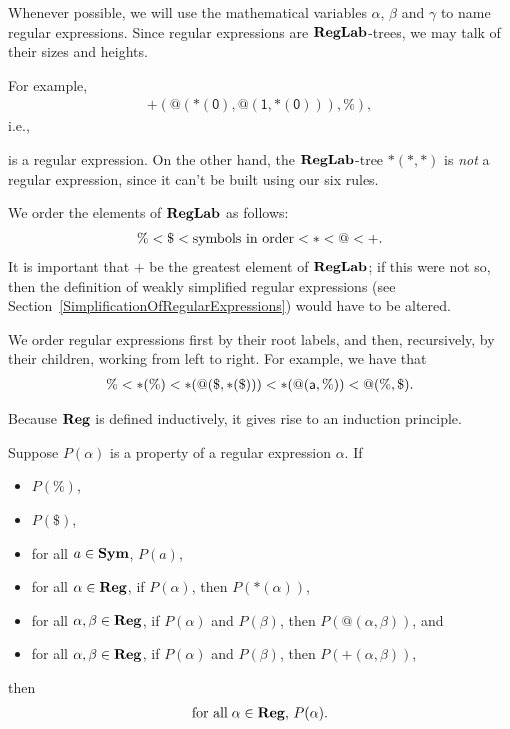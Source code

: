 Whenever possible, we will use the mathematical variables
$\alpha$, $\beta$ and $\gamma$
%
%
to name regular expressions. Since regular expressions are
$\mathbf{RegLab}$-trees, we may talk of their sizes and heights.

For example,
\begin{gather*}
\mathsf{{+}(@({*}(0),@(1,{*}(0))),\%)} ,
\end{gather*}
i.e.,
\begin{center}

\end{center}
is a regular expression.  On the other hand, the $\mathbf{RegLab}$-tree
$*(*,*)$ is \emph{not} a regular expression, since it can't be
built using our six rules.

We order the elements of $\mathbf{RegLab}$ as follows:
\begin{gather*}
\% < \$ < \allowbreak\mbox{symbols in order}\allowbreak < {*} < @ < {+} .
\end{gather*}
%
It is important that ${+}$ be the greatest element of $\mathbf{RegLab}$;
if this were not so, then the definition of weakly simplified regular
expressions (see Section~\ref{SimplificationOfRegularExpressions})
would have to be altered.

We order regular expressions first by their root labels, and then,
recursively, by their children, working from left to right.
For example, we have that
\begin{gather*}
\% < {*}(\%)
   < {*}(@(\$,{*}(\$)))
   < {*}(@(\mathsf{a},\%))
   < @(\%,\$) .
\end{gather*}

Because $\mathbf{Reg}$ is defined inductively, it gives rise to an induction
principle.

\begin{theorem}
Suppose $P(\alpha)$ is a property of a regular expression $\alpha$.
If
\begin{itemize}
\item $P(\%)$,

\item $P(\$)$,

\item for all $a\in\mathbf{Sym}$, $P(a)$,

\item for all $\alpha\in\mathbf{Reg}$, if $P(\alpha)$, then
$P({*}(\alpha))$,

\item for all $\alpha,\beta\in\mathbf{Reg}$, if $P(\alpha)$ and
$P(\beta)$, then $P(@(\alpha,\beta))$, and

\item for all $\alpha,\beta\in\mathbf{Reg}$, if $P(\alpha)$ and
$P(\beta)$, then $P({+}(\alpha,\beta))$,
\end{itemize}
then
\begin{gather*}
\allowbreak\mbox{for all}\allowbreak\;\alpha\in\mathbf{Reg},\,P(\alpha) .
\end{gather*}
\end{theorem}

